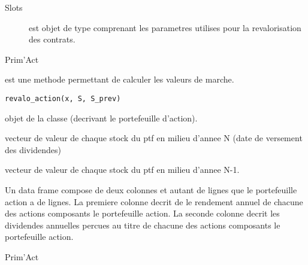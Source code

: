 \documentclass[a4paper]{book}
\begin{document}
%
\begin{Section}{Slots}

\begin{description}

\item[] est objet de type  comprenant
les parametres utilises pour la revalorisation des contrats.

\end{description}
\end{Section}
%
\begin{Author}\relax
Prim'Act
\end{Author}
%
\begin{Description}\relax
{} est une methode permettant de calculer les valeurs de marche.
\end{Description}
%
\begin{Usage}
\begin{verbatim}
revalo_action(x, S, S_prev)
\end{verbatim}
\end{Usage}
%
\begin{Arguments}
\begin{ldescription}
\item[\code{x}] objet de la classe  (decrivant le portefeuille d'action).

\item[\code{S}] vecteur  de valeur de chaque stock du ptf en milieu d'annee N (date de versement des dividendes)

\item[\code{S\_prev}] vecteur   de valeur de chaque stock du ptf en milieu d'annee N-1.
\end{ldescription}
\end{Arguments}
%
\begin{Value}
Un data frame compose de deux colonnes et autant de lignes que le portefeuille action a de lignes.
La premiere colonne decrit de le rendement annuel de chacune des actions composants le portefeuille action.
La seconde colonne decrit les dividendes annuelles percues au titre de chacune des actions composants le portefeuille action.
\end{Value}
%
\begin{Author}\relax
Prim'Act
\end{Author}
\end{document}
